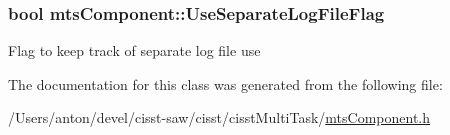 \subsubsection[{Use\+Separate\+Log\+File\+Flag}]{\setlength{\rightskip}{0pt plus 5cm}bool mts\+Component\+::\+Use\+Separate\+Log\+File\+Flag\hspace{0.3cm}{\ttfamily [protected]}}\label{classmts_component_a12390c92b351b911b723158e636a9e5a}
Flag to keep track of separate log file use 

The documentation for this class was generated from the following file\+:\begin{DoxyCompactItemize}
\item 
/\+Users/anton/devel/cisst-\/saw/cisst/cisst\+Multi\+Task/\hyperlink{mts_component_8h}{mts\+Component.\+h}\end{DoxyCompactItemize}
